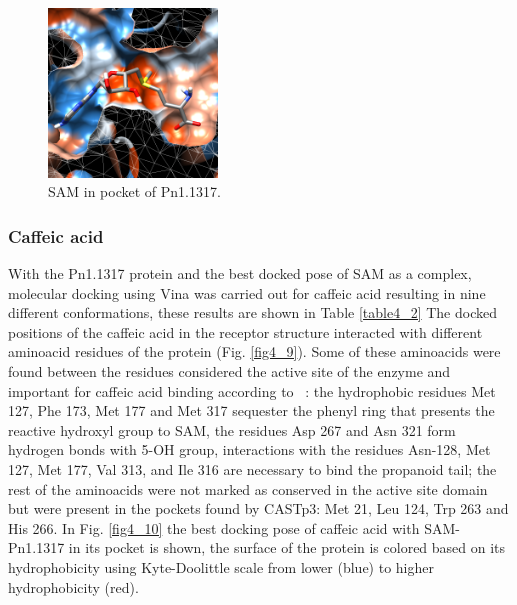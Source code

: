 \documentclass[12pt]{article}
\newcommand{\textcite}[1]{\citeauthor{#1}~\citeyear{#1}}
\begin{document}
	\FloatBarrier
	\begin{figure}[h!]
		\centering
		\includegraphics[width=0.4\textwidth]{../4/Dock/chimera.png}
		\caption{\centering SAM in pocket of Pn1.1317.}
		\label{fig4_8}
	\end{figure}
	\FloatBarrier
	
	
	\subsubsection{Caffeic acid}
	
	With the Pn1.1317 protein and the best docked pose of SAM as a complex, molecular docking using Vina was carried out for caffeic acid resulting in nine different conformations, these results are shown in Table \ref{table4_2} The docked positions of the caffeic acid in the receptor structure interacted with different aminoacid residues of the protein (Fig. \ref{fig4_9}). Some of these aminoacids were found between the residues considered the active site of the enzyme and important for caffeic acid binding according to \textcite{caff}: the hydrophobic residues Met 127, Phe 173, Met 177 and Met 317 sequester the phenyl ring that presents the reactive hydroxyl group to SAM, the residues Asp 267 and Asn 321 form hydrogen bonds with 5-OH group, interactions with the residues Asn-128, Met 127, Met 177, Val 313, and Ile 316 are necessary to bind the propanoid tail;
	the rest of the aminoacids were not marked as conserved in the active site domain but were present in the pockets found by CASTp3: Met 21, Leu 124, Trp 263 and His 266. In Fig. \ref{fig4_10} the best docking pose of caffeic acid with SAM-Pn1.1317 in its pocket is shown, the surface of the protein is colored based on its hydrophobicity using Kyte-Doolittle scale from lower (blue) to higher hydrophobicity (red).
	
\end{document}

